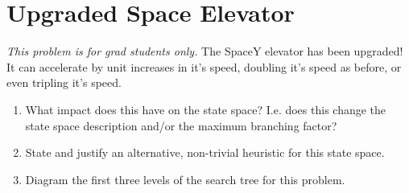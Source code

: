 \documentclass[12pt]{article}
\begin{document}
\newpage

\section{Upgraded Space Elevator}
\emph{This problem is for grad students only.} The SpaceY elevator has been upgraded! It can accelerate by unit increases in it's speed, doubling it's speed as before, or even tripling it's speed.

\begin{enumerate}
\item What impact does this have on the state space? I.e. does this change the state space description and/or the maximum branching factor?

\item State and justify an alternative, non-trivial heuristic for this state space.

\item Diagram the first three levels of the search tree for this problem.

\end{enumerate}
\end{document}
